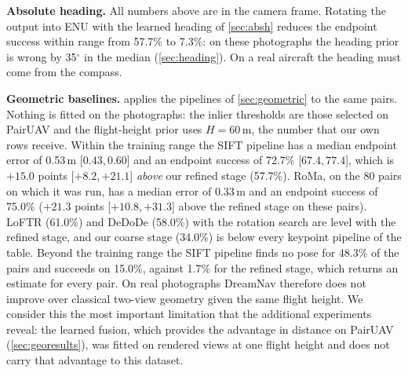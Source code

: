 \documentclass[10pt,twocolumn,letterpaper]{article}
\newcommand{\ci}[2]{{\scriptsize[\ensuremath{#1},\,\ensuremath{#2}]}}
\begin{document}
\noindent\textbf{Absolute heading.} All numbers above are in the camera frame. Rotating the output into ENU with the learned heading of \cref{sec:absh} reduces the endpoint success within range from 57.7\% to 7.3\%: on these photographs the heading prior is wrong by 35$^\circ$ in the median (\cref{sec:heading}). On a real aircraft the heading must come from the compass.

\noindent\textbf{Geometric baselines.}  applies the pipelines of \cref{sec:geometric} to the same pairs. Nothing is fitted on the photographs: the inlier thresholds are those selected on PairUAV and the flight-height prior uses $H{=}60$\,m, the number that our own rows receive. Within the training range the SIFT pipeline has a median endpoint error of 0.53\,m \ci{0.43}{0.60} and an endpoint success of 72.7\% \ci{67.4}{77.4}, which is \ensuremath{+15.0}{} points \ci{\ensuremath{+8.2}}{\ensuremath{+21.1}} \emph{above} our refined stage (57.7\%). RoMa, on the 80 pairs on which it was run, has a median error of 0.33\,m and an endpoint success of 75.0\% (\ensuremath{+21.3}{} points \ci{\ensuremath{+10.8}}{\ensuremath{+31.3}} above the refined stage on these pairs). LoFTR (61.0\%) and DeDoDe (58.0\%) with the rotation search are level with the refined stage, and our coarse stage (34.0\%) is below every keypoint pipeline of the table. Beyond the training range the SIFT pipeline finds no pose for 48.3\% of the pairs and succeeds on 15.0\%, against 1.7\% for the refined stage, which returns an estimate for every pair. On real photographs DreamNav therefore does not improve over classical two-view geometry given the same flight height. We consider this the most important limitation that the additional experiments reveal: the learned fusion, which provides the advantage in distance on PairUAV (\cref{sec:georesults}), was fitted on rendered views at one flight height and does not carry that advantage to this dataset.
\end{document}
